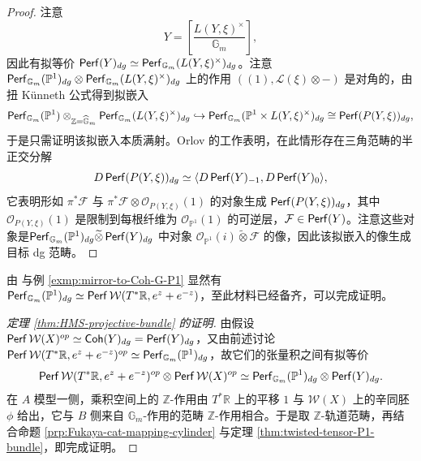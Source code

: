 \begin{proof}
    注意 \[
        Y=\left[\frac{L(Y,\xi)^{\times}}{\mathbb{G}_m}\right],
    \]因此有拟等价 $\operatorname{\mathsf{Perf}} (Y)_{dg}\simeq\operatorname{\mathsf{Perf}}_{\mathbb{G}_m} (L(Y,\xi)^{\times})_{dg}$。注意 $\operatorname{\mathsf{Perf}}_{\mathbb{G}_m} (\mathbb{P}^1)_{dg}\otimes\operatorname{\mathsf{Perf}}_{\mathbb{G}_m} (L(Y,\xi)^{\times})_{dg}$ 上的作用 $((1),\mathcal{L} (\xi)\otimes -)$ 是对角的，由扭 K\"unneth 公式得到拟嵌入 \[
        \operatorname{\mathsf{Perf}}_{\mathbb{G}_m} (\mathbb{P}^1)\otimes_{\mathbb{Z}=\widehat{\mathbb{G}}_m}\operatorname{\mathsf{Perf}}_{\mathbb{G}_m} (L(Y,\xi)^{\times})_{dg}\hookrightarrow\operatorname{\mathsf{Perf}}_{\mathbb{G}_m} (\mathbb{P}^1\times L(Y,\xi)^{\times} )_{dg}\cong\operatorname{\mathsf{Perf}} (P(Y,\xi))_{dg},
    \]于是只需证明该拟嵌入本质满射。Orlov \cite{Orlov92} 的工作表明，在此情形存在三角范畴的半正交分解 \[
    D\operatorname{\mathsf{Perf}} (P(Y,\xi))_{dg}\simeq\langle D\operatorname{\mathsf{Perf}}(Y)_{-1}, D\operatorname{\mathsf{Perf}}(Y)_0\rangle,
    \]它表明形如 $\pi^{\ast}\mathcal{F}$ 与 $\pi^{\ast}\mathcal{F}\otimes\mathcal{O}_{P(Y,\xi)} (1)$ 的对象生成 $\operatorname{\mathsf{Perf}}(P(Y,\xi))_{dg}$，其中 $\mathcal{O}_{P(Y,\xi)} (1)$ 是限制到每根纤维为 $\mathcal{O}_{\mathbb{P}^1} (1)$ 的可逆层，$\mathcal{F}\in\operatorname{\mathsf{Perf}} (Y)$。注意这些对象是$\operatorname{\mathsf{Perf}}_{\mathbb{G}_m} (\mathbb{P}^1)_{dg}\widetilde{\otimes}\operatorname{\mathsf{Perf}} (Y)_{dg}$ 中对象 $\mathcal{O}_{\mathbb{P}^1} (i)\widetilde{\otimes}\mathcal{F}$ 的像，因此该拟嵌入的像生成目标 dg 范畴。
\end{proof}

由 \cite{FLTZ12} 与例 \ref{exmp:mirror-to-Coh-G-P1} 显然有 $\operatorname{\mathsf{Perf}}_{\mathbb{G}_m} (\mathbb{P}^1)_{dg}\simeq\operatorname{\mathsf{Perf}}\mathcal{W} (T^{\ast}\mathbb{R},e^z+e^{-z})$，至此材料已经备齐，可以完成证明。

\begin{proof}[定理 \ref{thm:HMS-projective-bundle} 的证明]
    由假设 $\operatorname{\mathsf{Perf}}\mathcal{W} (X)^{op}\simeq\operatorname{\mathsf{Coh}} (Y)_{dg}=\operatorname{\mathsf{Perf}} (Y)_{dg}$，又由前述讨论 $\operatorname{\mathsf{Perf}}\mathcal{W} (T^{\ast}\mathbb{R},e^z+e^{-z})^{op}\simeq\operatorname{\mathsf{Perf}}_{\mathbb{G}_m} (\mathbb{P}^1)_{dg}$，故它们的张量积之间有拟等价 \[
        \operatorname{\mathsf{Perf}}\mathcal{W} (T^{\ast}\mathbb{R},e^z+e^{-z})^{op}\otimes\operatorname{\mathsf{Perf}}\mathcal{W} (X)^{op}\simeq\operatorname{\mathsf{Perf}}_{\mathbb{G}_m} (\mathbb{P}^1)_{dg}\otimes\operatorname{\mathsf{Perf}} (Y)_{dg}.
    \]在 $A$ 模型一侧，乘积空间上的 $\mathbb{Z}$-作用由 $T^{\ast}\mathbb{R}$ 上的平移 $1$ 与 $\mathcal{W} (X)$ 上的辛同胚 $\phi$ 给出，它与 $B$ 侧来自 $\mathbb{G}_m$-作用的范畴 $\mathbb{Z}$-作用相合。于是取 $\mathbb{Z}$-轨道范畴，再结合命题 \ref{prp:Fukaya-cat-mapping-cylinder} 与定理 \ref{thm:twisted-tensor-P1-bundle}，即完成证明。
\end{proof}

